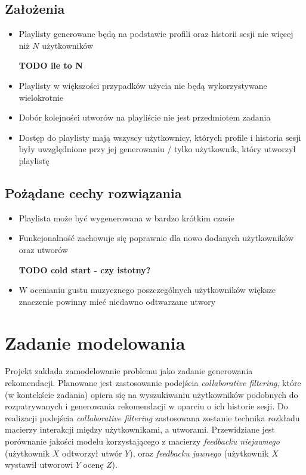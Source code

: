 \documentclass[10pt,a4paper]{article}
\begin{document}
\subsection{Założenia}
\begin{itemize}
	\item Playlisty generowane będą na podstawie profili oraz historii sesji nie więcej niż $N$ użytkowników 
	
	\textbf{TODO ile to N}
	
	\item Playlisty w większości przypadków użycia nie będą wykorzystywane wielokrotnie
	\item Dobór kolejności utworów na playliście nie jest przedmiotem zadania
	\item Dostęp do playlisty mają wszyscy użytkownicy, których profile i historia sesji były uwzględnione przy jej generowaniu / tylko użytkownik, który utworzył playlistę
\end{itemize}

\subsection{Pożądane cechy rozwiązania}
\begin{itemize}

\item Playlista może być wygenerowana w bardzo krótkim czasie

\item Funkcjonalność zachowuje się poprawnie dla nowo dodanych użytkowników oraz utworów

\textbf{TODO cold start - czy istotny?}

\item W ocenianiu gustu muzycznego poszczególnych użytkowników większe znaczenie powinny mieć niedawno odtwarzane utwory

\end{itemize}

\section{Zadanie modelowania}
	
Projekt zakłada zamodelowanie problemu jako zadanie generowania rekomendacji. Planowane jest zastosowanie podejścia \textit{collaborative filtering}, które (w kontekście zadania) opiera się na wyszukiwaniu użytkowników podobnych do rozpatrywanych i generowania rekomendacji w oparciu o ich historie sesji. Do realizacji podejścia \textit{collaborative filtering} zastosowana zostanie technika rozkładu macierzy interakcji między użytkownikami, a utworami. Przewidziane jest porównanie jakości modelu korzystającego z macierzy \textit{feedbacku niejawnego} (użytkownik $X$ odtworzył utwór $Y$), oraz \textit{feedbacku jawnego} (użytkownik $X$ wystawił utworowi $Y$ ocenę $Z$).
\end{document}
